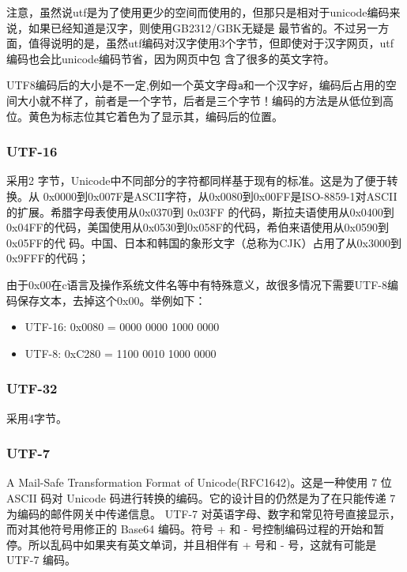 \documentclass[doctor,openright,twoside]{sjtuthesis}
\providecommand{\tightlist}{%
    \setlength{\itemsep}{0pt}\setlength{\parskip}{0pt}}
\newcommand{\passthrough}[1]{#1}
\theoremstyle{plain}
\theoremstyle{definition}
\theoremstyle{remark}
\theoremstyle{ocrenumbox}
\theoremstyle{plain}
\begin{document}
注意，虽然说utf是为了使用更少的空间而使用的，但那只是相对于unicode编码来说，如果已经知道是汉字，则使用GB2312/GBK无疑是
最节省的。不过另一方面，值得说明的是，虽然utf编码对汉字使用3个字节，但即使对于汉字网页，utf编码也会比unicode编码节省，因为网页中包
含了很多的英文字符。

UTF8编码后的大小是不一定,例如一个英文字母\passthrough{\lstinline!a!}和一个汉字\passthrough{\lstinline!好!}，编码后占用的空间大小就不样了，前者是一个字节，后者是三个字节！编码的方法是从低位到高位。黄色为标志位其它着色为了显示其，编码后的位置。

\hypertarget{utf-16}{%
\subsubsection{UTF-16}\label{utf-16}}

采用2
字节，Unicode中不同部分的字符都同样基于现有的标准。这是为了便于转换。从
0x0000到0x007F是ASCII字符，从0x0080到0x00FF是ISO-8859-1对ASCII的扩展。希腊字母表使用从0x0370到
0x03FF
的代码，斯拉夫语使用从0x0400到0x04FF的代码，美国使用从0x0530到0x058F的代码，希伯来语使用从0x0590到0x05FF的代
码。中国、日本和韩国的象形文字（总称为CJK）占用了从0x3000到0x9FFF的代码；

由于0x00在c语言及操作系统文件名等中有特殊意义，故很多情况下需要UTF-8编码保存文本，去掉这个0x00。举例如下：

\begin{itemize}
\tightlist
\item
  UTF-16: 0x0080 = 0000 0000 1000 0000
\item
  UTF-8: 0xC280 = 1100 0010 1000 0000
\end{itemize}

\hypertarget{utf-32}{%
\subsubsection{UTF-32}\label{utf-32}}

采用4字节。

\hypertarget{utf-7}{%
\subsubsection{UTF-7}\label{utf-7}}

A Mail-Safe Transformation Format of Unicode(RFC1642)。这是一种使用 7 位
ASCII 码对 Unicode 码进行转换的编码。它的设计目的仍然是为了在只能传递 7
为编码的邮件网关中传递信息。 UTF-7
对英语字母、数字和常见符号直接显示，而对其他符号用修正的 Base64
编码。符号 + 和 -
号控制编码过程的开始和暂停。所以乱码中如果夹有英文单词，并且相伴有 +
号和 - 号，这就有可能是 UTF-7 编码。
\end{document}
